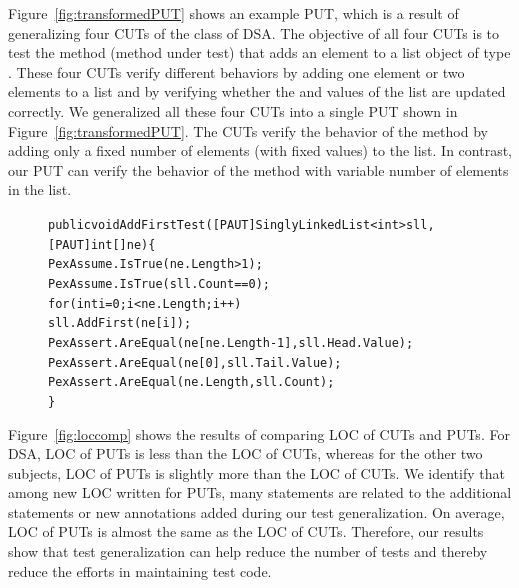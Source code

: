 Figure~\ref{fig:transformedPUT} shows an example PUT, which is a result of generalizing four CUTs of the  class of DSA. The objective of all four CUTs is to test the  method (method under test) that adds an element to a list object of type . These four CUTs verify different behaviors by adding one element or two elements to a list and by verifying whether the  and  values of the list are updated correctly. We generalized all these four CUTs into a single PUT shown in Figure~\ref{fig:transformedPUT}. The CUTs verify the behavior of the  method by adding only a fixed number of elements (with fixed values) to the list. In contrast, our PUT can verify the behavior of the  method with variable number of elements in the list. 

\begin{figure}[t]
\begin{CodeOut}
\begin{alltt}
public void AddFirstTest([PAUT]SinglyLinkedList<int> sll, 
\hspace*{0.6in}[PAUT]int[] ne) \{            
\hspace*{0.2in}PexAssume.IsTrue(ne.Length > 1);
\hspace*{0.2in}PexAssume.IsTrue(sll.Count == 0);
\hspace*{0.2in}for (int i = 0; i < ne.Length; i++)
\hspace*{0.4in}sll.AddFirst(ne[i]);
\hspace*{0.2in}PexAssert.AreEqual(ne[ne.Length - 1], sll.Head.Value);            
\hspace*{0.2in}PexAssert.AreEqual(ne[0], sll.Tail.Value);
\hspace*{0.2in}PexAssert.AreEqual(ne.Length, sll.Count);
\}
\end{alltt}
\end{CodeOut}
\end{figure}

Figure~\ref{fig:loccomp} shows the results of comparing LOC of CUTs and PUTs. For DSA, LOC of PUTs is less than the LOC of CUTs, whereas for the other two subjects, LOC of PUTs is slightly more than the LOC of CUTs. We identify that among new LOC written for PUTs, many statements are related to the additional  statements or new annotations added during our test generalization. On average, LOC of PUTs is almost the same as the LOC of CUTs. Therefore, our results show that test generalization can help reduce the number of tests and thereby reduce the efforts in maintaining test code.

